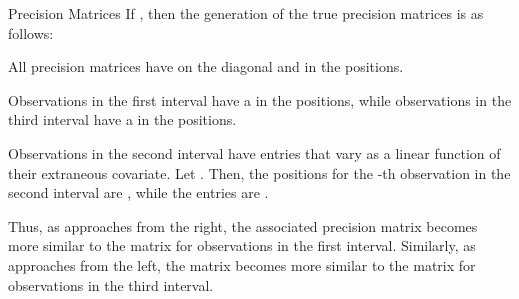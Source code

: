 \documentclass[a4paper]{book}
\begin{document}
\begin{Section}{Precision Matrices}
If , then the generation of the true precision
matrices is as follows:

All precision matrices have  on the diagonal and  in the
 positions.

Observations in the first interval have a  in the
 positions, while observations in the third interval
have a  in the  positions.

Observations in the second interval have  entries that vary as a
linear function of their extraneous covariate. Let
. Then, the  positions for
the -th observation in the second interval are
, while the 
entries are .

Thus, as  approaches  from the right, the associated
precision matrix becomes more similar to the matrix for observations in the
first interval. Similarly, as  approaches  from the left,
the matrix becomes more similar to the matrix for observations in the third
interval.
\end{Section}
%
\end{document}
